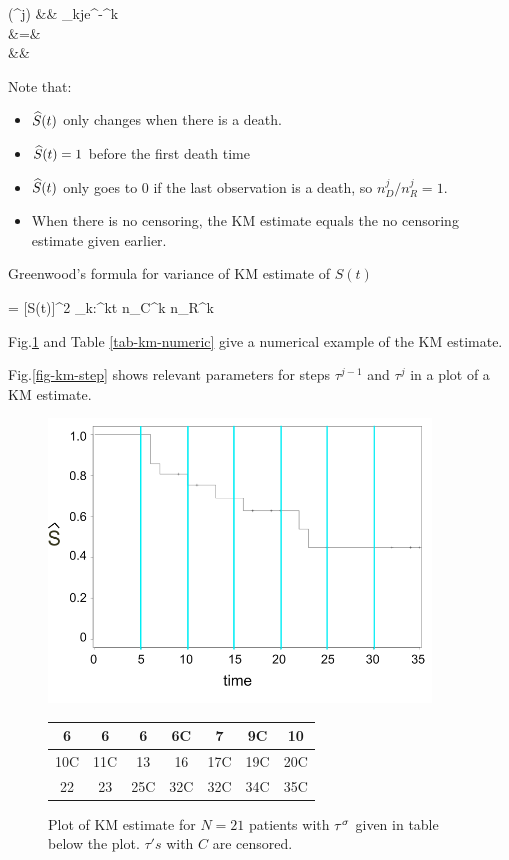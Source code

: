\beqa
{}(\tau^j) &\approx&
\prod_{k\leq j}e^{-\HAT{\lam}^k}
\\
&=&
\\
&\approx&
\eeqa

Note that:
\begin{itemize}
\item $\widehat{S}(t)$ only changes when there is a death.
\item $\widehat{S}(t)=1$ before the first death time
\item $\widehat{S}(t)$ only goes to 0 if the last observation is a death,
so $n_D^j/n_R^j=1$.
\item When there is no censoring, the KM estimate equals
the no censoring estimate given earlier.
\end{itemize}

Greenwood's formula
for variance of KM estimate of $S(t)$

\beq
{}=
[S(t)]^2
\sum_{k:\tau^k\leq t}
{ n_C^k n_R^k}
\eeq

Fig.\ref{fig-kn-graph}
and Table \ref{tab-km-numeric} give a numerical
example of the
 KM estimate.

Fig.\ref{fig-km-step}
shows relevant parameters
for steps $\tau^{j-1}$ and $\tau^j$
in a plot of a KM estimate.





\newpage
 \begin{figure}[h!]
\centering
\includegraphics[width=4in]
{survival/km-graph.png}
\begin{tabular}{|c|c|c|c|c|c|c|}
\hline\hline
6& 6& 6& 6C& 7& 9C& 10\\
\hline
10C&11C& 13& 16& 17C& 19C& 20C\\
\hline
 22& 23& 25C& 32C& 32C& 34C& 35C\\
 \hline
 \end{tabular}
\caption{Plot of KM estimate for
$N=21$ patients
with $\tau^\sigma$ given in table
below the plot.
$\tau's$ with $C$
 are censored.}
\label{fig-kn-graph}
\end{figure}

